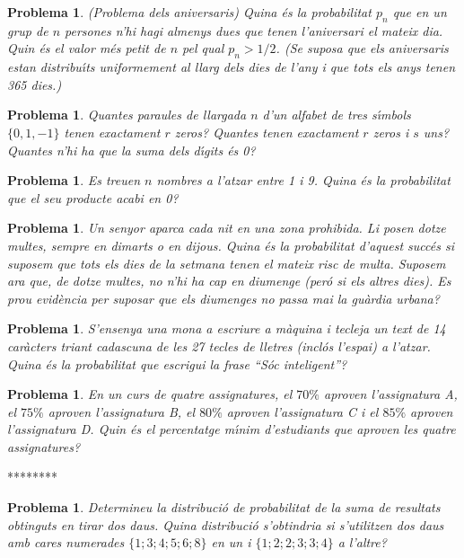 \documentclass[11pt]{article}
\newcounter{prbcont}
\newtheorem{problema}[prbcont]{Problema}
\begin{document}
\begin{problema}
(Problema dels aniversaris) Quina \'es la probabilitat $p_n$ que en un grup de $n$ persones n'hi
hagi almenys dues que tenen l'aniversari el mateix dia. Quin \'es el valor m\'es petit de $n$
pel qual $p_n > 1/2$. (Se suposa que els aniversaris estan distribu\'{\i}ts uniformement al llarg dels dies de l'any i que tots els anys tenen 365 dies.)
\end{problema}

\begin{problema}
Quantes paraules de llargada $n$ d'un alfabet de tres s\'{\i}mbols $\{0, 1, -1\}$ tenen exactament
$r$ zeros? Quantes tenen exactament $r$ zeros i $s$ uns? Quantes n'hi ha que la suma dels
d\'{\i}gits \'es 0?
\end{problema}

\begin{problema}
Es treuen $n$ nombres a l'atzar entre 1 i 9. Quina \'es la probabilitat que el seu producte
acabi en 0?
\end{problema}

\begin{problema}
Un senyor aparca cada nit en una zona prohibida. Li posen dotze multes, sempre en
dimarts o en dijous. Quina \'es la probabilitat d'aquest succ\'es si suposem que tots els
dies de la setmana tenen el mateix risc de multa. Suposem ara que, de dotze multes, no
n'hi ha cap en diumenge (per\'o si els altres dies). Es prou evid\`encia per suposar que els
diumenges no passa mai la gu\`ardia urbana?
\end{problema}

\begin{problema}
S'ensenya una mona a escriure a m\`aquina i tecleja un text de 14 car\`acters triant cadascuna
de les 27 tecles de lletres (incl\'os l'espai) a l'atzar. Quina \'es la probabilitat que escrigui
la frase ``S\'oc inteligent''?
\end{problema}

\begin{problema}
En un curs de quatre assignatures, el $70\%$ aproven l'assignatura A, el $75\%$ aproven l'assignatura B, el $80\%$ aproven l'assignatura C i el $85\%$ aproven l'assignatura D. Quin \'es el percentatge m\'{\i}nim d'estudiants que aproven les quatre assignatures?
\end{problema}


********


\begin{problema}
Determineu la distribuci\'o de probabilitat de la suma de resultats obtinguts en tirar
dos daus. Quina distribuci\'o s'obtindria si s'utilitzen dos daus amb cares numerades $\{1; 3; 4; 5; 6; 8\}$ en un i $\{1; 2; 2; 3; 3; 4\}$ a l'altre?
\end{problema}
\end{document}
